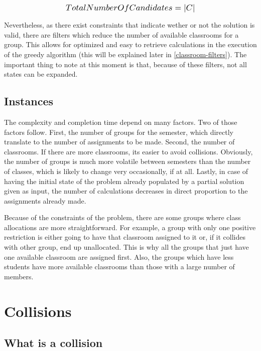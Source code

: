 \begin{equation}
    \scalebox{1.2}{$TotalNumberOfCandidates = \left|C\right|$}
\end{equation}

Nevertheless, as there exist constraints that indicate wether or not the solution is valid, there are filters which reduce the number of available classrooms for a group. This allows for optimized and easy to retrieve calculations in the execution of the greedy algorithm (this will be explained later in \ref{classroom-filters}). The important thing to note at this moment is that, because of these filters, not all states can be expanded.

\subsection{Instances}

The complexity and completion time depend on many factors. Two of those factors follow. First, the number of groups for the semester, which directly translate to the number of assignments to be made. Second, the number of classrooms. If there are more classrooms, its easier to avoid collisions. Obviously, the number of groups is much more volatile between semesters than the number of classes, which is likely to change very occasionally, if at all. Lastly, in case of having the initial state of the problem already populated by a partial solution given as input, the number of calculations decreases in direct proportion to the assignments already made.

Because of the constraints of the problem, there are some groups where class allocations are more straightforward. For example, a group with only one positive restriction is either going to have that classroom assigned to it or, if it collides with other group, end up unallocated. This is why all the groups that just have one available classroom are assigned first. Also, the groups which have less students have more available classrooms than those with a large number of members.



\section{Collisions}


\subsection{What is a collision}

